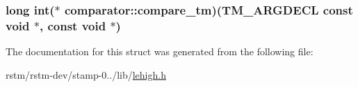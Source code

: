 \hypertarget{structcomparator_a272b38f55e10cd75a0c919a66706c8fc}{
\subsubsection[{compare\-\_\-tm}]{ long int($\ast$ comparator\-::compare\-\_\-tm)({\bf T\-M\-\_\-\-A\-R\-G\-D\-E\-C\-L} const void $\ast$, const void $\ast$)}}\label{structcomparator_a272b38f55e10cd75a0c919a66706c8fc}


The documentation for this struct was generated from the following file\-:\begin{DoxyCompactItemize}
\item 
rstm/rstm-\/dev/stamp-\/0../lib/\hyperlink{lehigh_8h}{lehigh.\-h}\end{DoxyCompactItemize}
